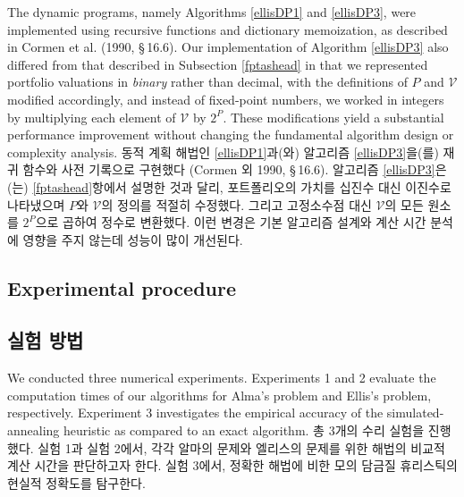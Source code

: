 \documentclass[11pt]{article} %
\theoremstyle{definition}
\theoremstyle{definition}
\begin{document}
\ifen
The dynamic programs, namely Algorithms \ref{ellisDP1} and \ref{ellisDP3}, were implemented using recursive functions and dictionary memoization, as described in Cormen et al. (1990, \S\,16.6). Our implementation of Algorithm \ref{ellisDP3} also differed from that described in Subsection \ref{fptashead} in that we represented portfolio valuations in \emph{binary} rather than decimal, with the definitions of $P$ and $\mathcal{V}$ modified accordingly, and instead of fixed-point numbers, we worked in integers by multiplying each element of $\mathcal{V}$ by $2^P$. These modifications yield a substantial performance improvement without changing the fundamental algorithm design or complexity analysis.
\else
동적 계획 해법인 \ref{ellisDP1}과(와) 알고리즘 \ref{ellisDP3}을(를) 재귀 함수와 사전 기록으로 구현했다 (Cormen 외 1990, \S\,16.6). 알고리즘 \ref{ellisDP3}은(는) \ref{fptashead}항에서 설명한 것과 달리, 포트폴리오의 가치를 십진수 대신 이진수로 나타냈으며 $P$와  $\mathcal{V}$의 정의를 적절히 수정했다. 그리고 고정소수점 대신 $\mathcal{V}$의 모든 원소를 $2^P$으로 곱하여 정수로 변환했다. 이런 변경은 기본 알고리즘 설계와 계산 시간 분석에 영향을 주지 않는데 성능이 많이 개선된다.
\fi


\ifen \subsection{Experimental procedure} \else \subsection{실험 방법}\fi
\ifen
We conducted three numerical experiments. Experiments 1 and 2 evaluate the computation times of our algorithms for Alma's problem and Ellis's problem, respectively. Experiment 3 investigates the empirical accuracy of the simulated-annealing heuristic as compared to an exact algorithm. 
\else
총 3개의 수리 실험을 진행했다. 실험 1과 실험 2에서, 각각 알마의 문제와 엘리스의 문제를 위한 해법의 비교적 계산 시간을 판단하고자 한다. 실험 3에서, 정확한 해법에 비한 모의 담금질 휴리스틱의 현실적 정확도를 탐구한다.
\fi
\end{document}

